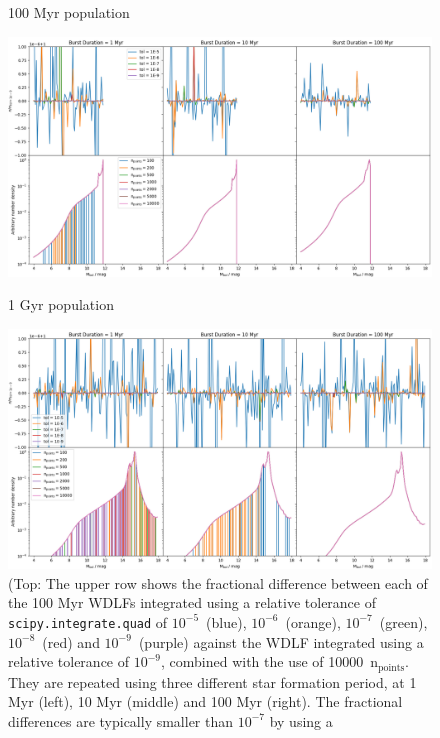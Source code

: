 \documentclass[fleqn,usenatbib]{mnras}
\begin{document}
\begin{figure}
    \centering
    \begin{large}
        100 Myr population
    \end{large}
    \includegraphics[width=1.0\linewidth]{figures/fig_A_age_1000000000.png} \\
    \begin{large}
        1 Gyr population 
    \end{large}
    \includegraphics[width=1.0\linewidth]{figures/fig_A_age_10000000000.png}
    \caption{(Top: The upper row shows the fractional difference between each of
    the 100 Myr WDLFs integrated using a relative tolerance of
    \texttt{scipy.integrate.quad} of $10^{-5}$~(blue), $10^{-6}$~(orange),
    $10^{-7}$~(green), $10^{-8}$~(red) and $10^{-9}$~(purple) against the WDLF
    integrated using a relative tolerance of $10^{-9}$, combined with the use
    of 10000~n$_{\mathrm{points}}$. They are repeated using three different
    star formation period, at 1 Myr (left), 10 Myr (middle) and 100 Myr (right).
    The fractional differences are typically smaller than $10^{-7}$ by using a
}
\end{figure}
\end{document}
